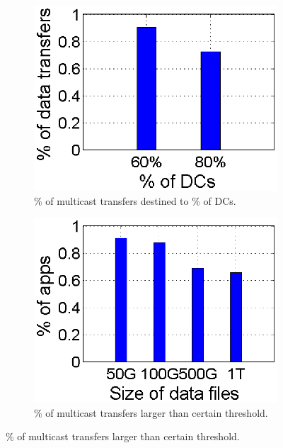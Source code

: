 \begin{figure}[t]
        \centering
        \begin{subfigure}[b]{0.23\textwidth}
                \centering
                \includegraphics[width=\textwidth]{images/destinationDC.eps}%
                \caption{\% of multicast transfers destined to \% of DCs.}
                \label{fig:bulk:dest}
        \end{subfigure}
	\hspace{0.1cm}
        \begin{subfigure}[b]{0.23\textwidth}
                \centering
                \includegraphics[width=\textwidth]{images/DataSize.eps}
                \caption{\% of multicast transfers larger than certain threshold.}
                \label{fig:bulk:size}
        \end{subfigure}
        \label{fig:bulk}
\vspace{-0.4cm}
\end{figure}

